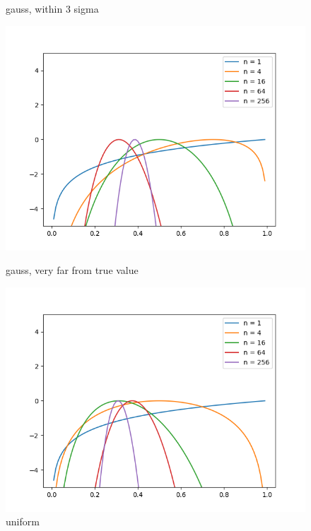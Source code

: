 \documentclass[english]{scrartcl}
\begin{document}
\begin{figure}[H]
	\caption{gauss, within 3 sigma} 
	\endminipage \hfill
	\includegraphics[width=\linewidth]{coin/h=0.4/gauss_far}
	\caption{gauss, very far from true value} 
	\endminipage \hfill
	\includegraphics[width=\linewidth]{coin/h=0.4/unif}
	\caption{uniform} 
	\endminipage \hfill
\end{figure}
\end{document}
